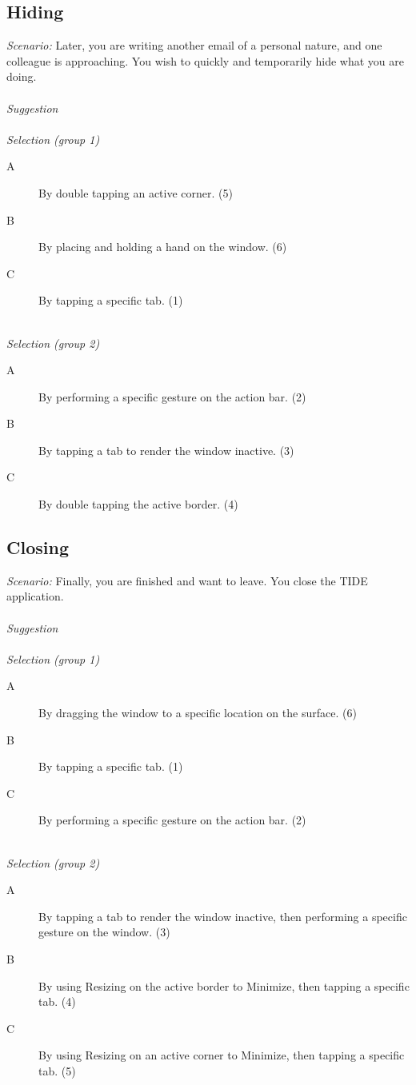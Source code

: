 
\subsection{Hiding}

\emph{Scenario:}
Later, you are writing another email of a personal nature, and one colleague is approaching. You wish to quickly and temporarily hide what you are doing.
\hfill\\
\hfill\\
\emph{Suggestion}
\hfill\\
\hfill\\
\emph{Selection (group 1)}
\begin{description}
\item[A]{By double tapping an active corner. (5)}
\item[B]{By placing and holding a hand on the window. (6)}
\item[C]{By tapping a specific tab. (1)}
\end{description}
\hfill\\
\emph{Selection (group 2)}
\begin{description}
\item[A]{By performing a specific gesture on the action bar. (2)}
\item[B]{By tapping a tab to render the window inactive. (3)}
\item[C]{By double tapping the active border. (4)}
\end{description}



\subsection{Closing}

\emph{Scenario:}
Finally, you are finished and want to leave. You close the TIDE application.
\hfill\\
\hfill\\
\emph{Suggestion}
\hfill\\
\hfill\\
\emph{Selection (group 1)}
\begin{description}
\item[A]{By dragging the window to a specific location on the surface. (6)}
\item[B]{By tapping a specific tab. (1)}
\item[C]{By performing a specific gesture on the action bar. (2)}
\end{description}
\hfill\\
\emph{Selection (group 2)}
\begin{description}
\item[A]{By tapping a tab to render the window inactive, then performing a specific gesture on the window. (3)}
\item[B]{By using Resizing on the active border to Minimize, then tapping a specific tab. (4)}
\item[C]{By using Resizing on an active corner to Minimize, then tapping a specific tab. (5)}
\end{description}


